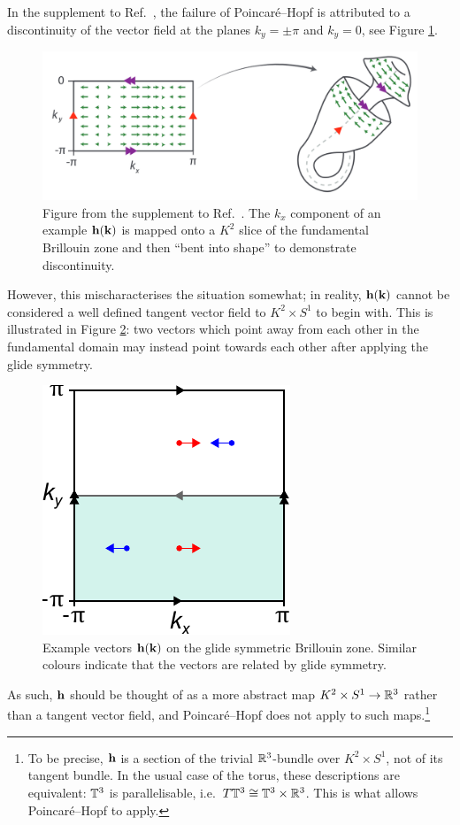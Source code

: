 In the supplement to Ref.\ \cite{Fonseca-Vaidya_nonorientable}, the failure of Poincaré--Hopf is attributed to a discontinuity of the vector field at the planes $k_y=\pm\pi$ and $k_y=0$, see Figure \ref{fig:Klein-discontinuity}.
\begin{figure}[htb!]
	\centering
	\includegraphics[width=.8\linewidth]{Images/Klein-discontinuity}
	\caption{Figure from the supplement to Ref.\ \cite{Fonseca-Vaidya_nonorientable}. The $k_x$ component of an example $\vb{h}(\vb{k})$ is mapped onto a $K^2$ slice of the fundamental Brillouin zone and then ``bent into shape'' to demonstrate discontinuity.
	}
	\label{fig:Klein-discontinuity}
\end{figure}
However, this mischaracterises the situation somewhat; in reality, $\vb{h}(\vb{k})$ cannot be considered a well defined tangent vector field to $K^2\times S^1$ to begin with. This is illustrated in Figure \ref{fig:BZ_vectors}: two vectors which point away from each other in the fundamental domain may instead point towards each other after applying the glide symmetry.
\begin{figure}[htb!]
	\centering
	\includegraphics[width=.3\linewidth]{Images/BZ_vectors}
	\caption{Example vectors $\vb{h}(\vb{k})$ on the glide symmetric Brillouin zone. Similar colours indicate that the vectors are related by glide symmetry.}
	\label{fig:BZ_vectors}
\end{figure}
As such, $\vb{h}$ should be thought of as a more abstract map $K^2\times S^1\to\mathbb{R}^3$ rather than a tangent vector field, and Poincaré--Hopf does not apply to such maps.\footnote{
	To be precise, $\vb{h}$ is a section of the trivial $\mathbb{R}^3$-bundle over $K^2\times S^1$, not of its tangent bundle. In the usual case of the torus, these descriptions are equivalent: $\mathbb{T}^3$ is parallelisable, i.e.\ $T\mathbb{T}^3\cong \mathbb{T}^3\times\mathbb{R}^3$. This is what allows Poincaré--Hopf to apply.}
